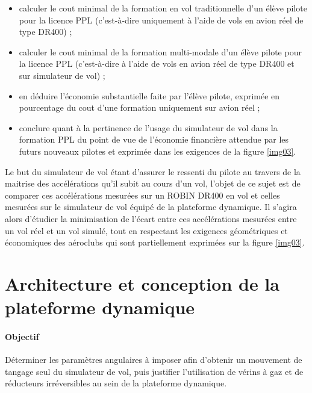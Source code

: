 \newpage 

\begin{itemize}
 \item calculer le cout minimal de la formation en vol traditionnelle d'un élève pilote pour la licence PPL (c'est-à-­dire uniquement à l'aide de vols en avion réel de type DR400) ;
 \item calculer le cout minimal de la formation multi-modale d'un élève pilote pour la licence PPL (c'est-à-dire à l'aide de vols en avion réel de type DR400 et sur simulateur de vol) ; 
 \item en déduire l'économie substantielle faite par l'élève pilote, exprimée en pourcentage du cout d'une formation uniquement sur avion réel ; 
 \item conclure quant à la pertinence de l'usage du simulateur de vol dans la formation PPL du point de vue de l'économie financière attendue par les futurs nouveaux pilotes et exprimée 
dans les exigences de la figure \ref{img03}.
\end{itemize} 

Le but du simulateur de vol étant d'assurer le ressenti du pilote au travers de la maitrise des accélérations qu'il subit au cours d'un vol, l'objet de ce sujet est de comparer ces accélérations mesurées sur un ROBIN DR400 en vol et celles mesurées sur le simulateur de vol équipé de la plateforme dynamique. Il s'agira alors d'étudier la minimisation de l'écart entre ces accélérations mesurées entre un vol réel et un vol simulé, tout en respectant les exigences géométriques et économiques des aéroclubs qui sont partiellement exprimées sur la figure \ref{img03}. 

\section{Architecture et conception de la plateforme dynamique}

\paragraph{Objectif}

Déterminer les paramètres angulaires à imposer afin d'obtenir un mouvement de tangage seul du simulateur de vol, puis justifier l'utilisation de vérins à gaz et de réducteurs irréversibles au sein de la plateforme dynamique.

